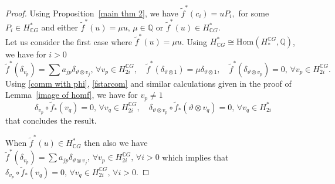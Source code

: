 \documentclass{amsart}
\newcommand{\lemref}[1]{Lemma~\ref{#1}}
\newcommand{\propref}[1]{Proposition~\ref{#1}}
\renewcommand{\hom}{\mathrm{Hom}}
\begin{document}
	\begin{proof}
		Using \propref{main thm 2}, we have $\tilde{f}^*(c_i) = u P_i,$ for some $P_i\in H^*_{\mathbb{C}G}$ and either $\tilde{f}^*(u) = \mu u,\, \mu \in \mathbb{Q}$ or $\tilde{f}^*(u)\in H^*_{\mathbb{C}G}$. \\
		Let us consider the first case where $\tilde{f}^*(u) = \mu u$. Using $H^*_{\mathbb{C}G}\cong \hom(H_*^{\mathbb{C}G},\mathbb{Q})$, we have for $i>0$ 
		\begin{equation}\label{fstarcom}
			\tilde{f}^*(\delta_{v_p}) = \sum a_{jp}\delta_{\vartheta \otimes v_j} , \, \forall v_{p}\in H_{2i}^{\mathbb{C}G}, \quad \tilde{f}^*(\delta_{\vartheta\otimes 1})  =\mu \delta_{\vartheta \otimes 1}, \quad \tilde{f}^*(\delta_{\vartheta\otimes v_{p}})  = 0, \, \forall v_{p}\in H_{2i}^{\mathbb{C}G}.
		\end{equation}
		Using \eqref{comm with phi}, \eqref{fstarcom} and similar calculations given in the proof of \lemref{image of homf}, we have for $ v_p\neq 1$
		$$\delta_{v_p}\circ \tilde{f}_*(v_q) = 0,\, \forall v_q \in H_{2i}^{\mathbb{C}G},\quad \delta_{\vartheta\otimes v_p}\circ \tilde{f}_*(\vartheta\otimes v_q) =0,\, \forall v_q \in H_{2i}^{*}$$ that concludes the result.
		
		When $\tilde{f}^*(u)\in H^*_{\mathbb{C}G}$ then also we have $\tilde{f}^*(\delta_{v_p}) = \sum a_{jp}\delta_{\vartheta \otimes v_j} , \, \forall v_{p}\in H_{2i}^{\mathbb{C}G},\, \forall i>0$ which implies that $\delta_{v_p}\circ \tilde{f}_*(v_q) = 0,\, \forall v_q \in H_{2i}^{\mathbb{C}G},\,\forall i>0.$   		
	\end{proof}

	
	
\end{document}
